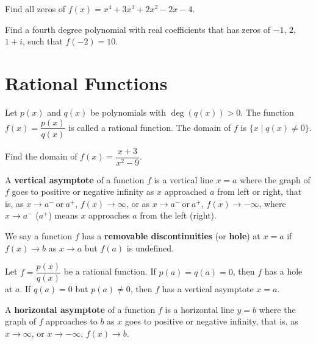 \begin{exercise}
  Find all zeros of $f(x)=x^4 + 3 x^3 + 2 x^2 - 2 x - 4$.
\end{exercise}


\begin{exercise}
  Find a fourth degree polynomial with real coefficients that has zeros of $-1$, $2$, $1+i$, such that $f(-2)=10$.
\end{exercise}

\newpage

\section{Rational Functions}
\begin{definition}
  Let $p(x)$ and $q(x)$ be polynomials with $\deg(q(x))>0$. The function $f(x)=\dfrac{p(x)}{q(x)}$ is called a rational function. The domain of $f$ is $\{x\mid q(x)\ne 0\}$.
\end{definition}

\begin{example}
  Find the domain of $f(x)=\dfrac{x+3}{x^2-9}$.
\end{example}

\begin{definition}
  A \textbf{vertical asymptote} of a function $f$ is a vertical line $x=a$ where the graph of $f$ goes to positive or negative infinity as $x$ approached $a$ from left or right, that is, as $x\rightarrow a^- ~\text{or}~ a^+$, $f(x)\rightarrow \infty$, or as $x\rightarrow a^- ~\text{or}~ a^+$, $f(x)\rightarrow -\infty$, where $x\to a^-$ ($a^+$) means $x$ approaches $a$ from the left (right).

  We say a function $f$ has a \textbf{removable discontinuities} (or \textbf{hole}) at $x=a$ if $f(x)\to b$ as $x\to a$ but $f(a)$ is undefined.
\end{definition}

\begin{proposition}
  Let $f=\dfrac{p(x)}{q(x)}$ be a rational function. If $p(a)=q(a)=0$, then $f$ has a hole at $a$. If $q(a)=0$ but $p(a)\ne 0$, then $f$ has a vertical asymptote $x=a$.
\end{proposition}

\begin{definition}
A \textbf{horizontal asymptote} of a function $f$ is a horizontal line $y=b$ where the graph of $f$ approaches to $b$ as $x$ goes to positive or negative infinity, that is,   
as $x\rightarrow \infty$, or $x\rightarrow -\infty$, $f(x)\rightarrow b$.
\end{definition}

